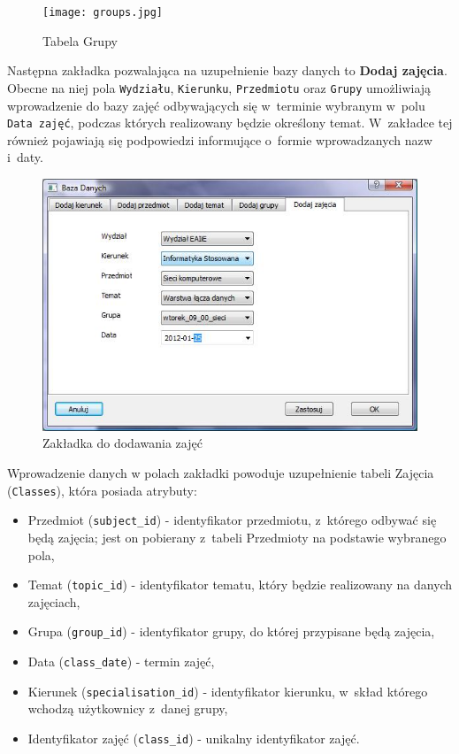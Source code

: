 \begin{figure}
\begin{center}
\texttt{[image: groups.jpg]}
\caption{Tabela Grupy}
\label{fig:groups}
\end{center}
\end{figure}

Następna zakładka pozwalająca na uzupełnienie bazy danych to \textbf{Dodaj zajęcia}. Obecne na niej pola \verb!Wydziału!, \verb!Kierunku!, \verb!Przedmiotu! oraz \verb!Grupy! umożliwiają wprowadzenie do bazy zajęć odbywających się w~terminie wybranym w~polu \verb!Data zajęć!, podczas których realizowany będzie określony temat. W~zakładce tej również pojawiają się podpowiedzi informujące o~formie wprowadzanych nazw i~daty.

\begin{figure}
\begin{center}
\includegraphics[scale=0.7]{dodaj_zajecia.jpg}
\caption{Zakładka do dodawania zajęć}
\label{fig:dodajZajecia}
\end{center}
\end{figure}

 Wprowadzenie danych w polach zakładki powoduje uzupełnienie tabeli Zajęcia (\verb!Classes!), która posiada atrybuty:
\begin{itemize}
\item Przedmiot (\verb!subject_id!) - identyfikator przedmiotu, z~którego odbywać się będą zajęcia; jest on pobierany z~tabeli Przedmioty na podstawie wybranego pola,
\item Temat (\verb!topic_id!) - identyfikator tematu, który będzie realizowany na danych zajęciach,
\item Grupa (\verb!group_id!) - identyfikator grupy, do której przypisane będą zajęcia,
\item Data (\verb!class_date!) - termin zajęć,
\item Kierunek (\verb!specialisation_id!) - identyfikator kierunku, w~skład którego wchodzą użytkownicy z~danej grupy,
\item Identyfikator zajęć (\verb!class_id!) - unikalny identyfikator zajęć.
\end{itemize}

